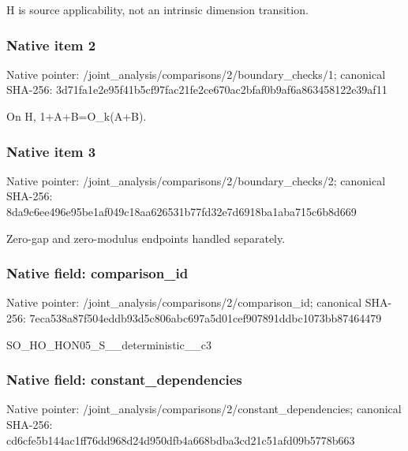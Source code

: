 \documentclass[10pt,a4paper]{article}
\begin{document}
\begingroup\raggedright\sloppy H is source applicability,\allowbreak{} not an intrinsic dimension transition.\par\endgroup

\subsubsection{Native item 2}
Native pointer: /joint\_\allowbreak{}analysis/comparisons/2/boundary\_\allowbreak{}checks/1; canonical SHA-256: 3d71fa1e2e95f41b5cf97fac21fe2ce670ac2bfaf0b9af6a863458122e39af11

\begingroup\raggedright\sloppy On H,\allowbreak{} 1+A+B=\allowbreak{}O\_\allowbreak{}k(A+B).\par\endgroup

\subsubsection{Native item 3}
Native pointer: /joint\_\allowbreak{}analysis/comparisons/2/boundary\_\allowbreak{}checks/2; canonical SHA-256: 8da9c6ee496e95be1af049c18aa626531b77fd32e7d6918ba1aba715c6b8d669

\begingroup\raggedright\sloppy Zero-gap and zero-modulus endpoints handled separately.\par\endgroup

\subsubsection{Native field: comparison\_\allowbreak{}id}
Native pointer: /joint\_\allowbreak{}analysis/comparisons/2/comparison\_\allowbreak{}id; canonical SHA-256: 7eca538a87f504eddb93d5c806abc697a5d01cef907891ddbc1073bb87464479

\begingroup\raggedright\sloppy SO\_\allowbreak{}HO\_\allowbreak{}HON05\_\allowbreak{}S\_\allowbreak{}\_\allowbreak{}deterministic\_\allowbreak{}\_\allowbreak{}c3\par\endgroup

\subsubsection{Native field: constant\_\allowbreak{}dependencies}
Native pointer: /joint\_\allowbreak{}analysis/comparisons/2/constant\_\allowbreak{}dependencies; canonical SHA-256: cd6cfe5b144ac1ff76dd968d24d950dfb4a668bdba3cd21c51afd09b5778b663
\end{document}
